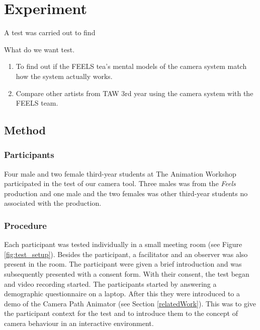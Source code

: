 \section{Experiment}


A test was carried out to find 

What do we want test.

\begin{enumerate}
\item To find out if the FEELS tea's mental models of the camera system match how the system actually works.
\item Compare other artists from TAW 3rd year using the camera system with the FEELS team.
\end{enumerate}






\subsection{Method} \label{method}

\subsubsection{Participants}
Four male and two female third-year students at The Animation Workshop participated in the test of our camera tool. Three males was from the \textit{Feels} production and one male and the two females was other third-year students no associated with the production. 

\subsubsection{Procedure}
Each participant was tested individually in a small meeting room (see Figure \ref{fig:test_setup}). Besides the participant, a facilitator and an observer was also present in the room. The participant were given a brief introduction and was subsequently presented with a consent form. With their consent, the test began and video recording started. The participants started by answering a demographic questionnaire on a laptop. After this they were introduced to a demo of the Camera Path Animator (see Section \ref{relatedWork}). This was to give the participant context for the test and to introduce them to the concept of camera behaviour in an interactive environment. 

